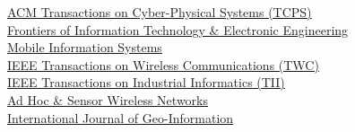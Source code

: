 {\href{http://tcps.acm.org/}{ACM Transactions on Cyber-Physical Systems (TCPS)}} \\
{\href{http://www.springer.com/computer/journal/11714}{Frontiers of Information Technology \& Electronic Engineering}} \\
{\href{https://www.hindawi.com/journals/misy/}{Mobile Information Systems}} \\
{\href{http://www.comsoc.org/twc}{IEEE Transactions on Wireless Communications (TWC)}} \\
{\href{http://www.ieee-ies.org/pubs/transactions-on-industrial-informatics}{IEEE Transactions on Industrial Informatics (TII)}} \\
{\href{http://www.oldcitypublishing.com/AHSWN/AHSWN.html}{Ad Hoc \& Sensor Wireless Networks}} \\
{\href{http://www.mdpi.com/journal/ijgi}{International Journal of Geo-Information}} \\
